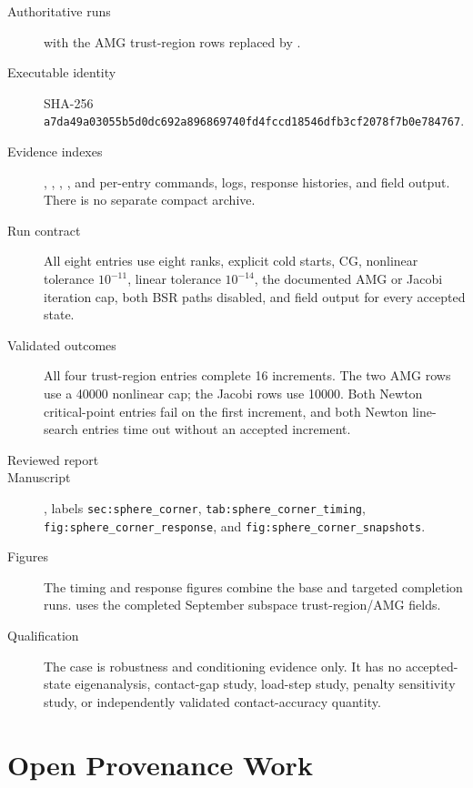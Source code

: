 \documentclass[11pt]{article}
\newcommand{\sha}[2]{\texttt{#1}\allowbreak\texttt{#2}}
\begin{document}
\begin{description}
  \item[Authoritative runs]  with the AMG trust-region rows replaced by .
  \item[Executable identity] SHA-256 \sha{a7da49a03055b5d0dc692a896869740f}{d4fccd18546dfb3cf2078f7b0e784767}.
  \item[Evidence indexes] , , , , and per-entry commands, logs, response histories, and field output.  There is no separate compact archive.
  \item[Run contract] All eight entries use eight ranks, explicit cold starts, CG, nonlinear tolerance $10^{-11}$, linear tolerance $10^{-14}$, the documented AMG or Jacobi iteration cap, both BSR paths disabled, and field output for every accepted state.
  \item[Validated outcomes] All four trust-region entries complete 16 increments.  The two AMG rows use a 40000 nonlinear cap; the Jacobi rows use 10000.  Both Newton critical-point entries fail on the first increment, and both Newton line-search entries time out without an accepted increment.
  \item[Reviewed report] 
  \item[Manuscript] , labels \texttt{sec:sphere\_corner}, \texttt{tab:sphere\_corner\_timing}, \texttt{fig:sphere\_corner\_response}, and \texttt{fig:sphere\_corner\_snapshots}.
  \item[Figures] The timing and response figures combine the base and targeted completion runs.   uses the completed September subspace trust-region/AMG fields.
  \item[Qualification] The case is robustness and conditioning evidence only.  It has no accepted-state eigenanalysis, contact-gap study, load-step study, penalty sensitivity study, or independently validated contact-accuracy quantity.
\end{description}

\section*{Open Provenance Work}
\end{document}
